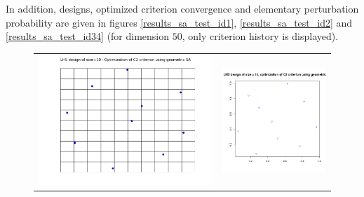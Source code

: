 In addition, designs, optimized criterion convergence and elementary perturbation probability are given in figures \ref{results_sa_test_id1}, \ref{results_sa_test_id2} and \ref{results_sa_test_id34} (for dimension $50$, only criterion history is displayed).
\begin{figure}[!h]
\begin{center}
\begin{tabular}{>{\centering\arraybackslash}m{8cm}>{\centering\arraybackslash}m{8cm}}
 \includegraphics[scale=0.35]{lhs_sa_geom_10.png} & \includegraphics[scale=0.35]{dice_lhs_sa_geom_10.png} \\

\end{tabular}
\end{center}
\end{figure}
